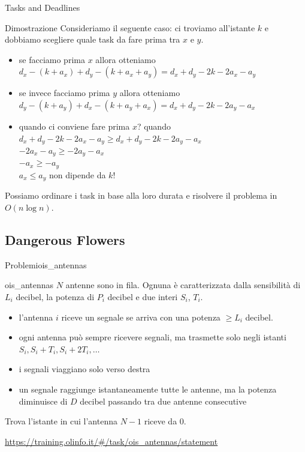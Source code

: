 \documentclass[compress]{beamer}
\begin{document}
\begin{frame}{Tasks and Deadlines}
    \begin{block}{Dimostrazione}
        Consideriamo il seguente caso: ci troviamo all'istante $k$ e dobbiamo scegliere quale task da fare prima tra $x$ e $y$.
        \begin{itemize}
            \pause
            \item se facciamo prima $x$ allora otteniamo $d_x-(k+a_x)+ d_y-(k+a_x+a_y) = d_x+d_y-2k-2a_x-a_y$
            \item se invece facciamo prima $y$ allora otteniamo $d_y-(k+a_y)+ d_x-(k+a_y+a_x) = d_x+d_y-2k-2a_y-a_x$
            \pause
            \item quando ci conviene fare prima $x$? quando \\ $d_x+d_y-2k-2a_x-a_y \geq d_x+d_y-2k-2a_y-a_x$ \\ \pause $-2a_x-a_y \geq -2a_y-a_x$  \pause \\ $-a_x \geq -a_y$ \\ $a_x \leq a_y$  non dipende da $k$!
        \end{itemize}
    \end{block}
    \pause
    Possiamo ordinare i task in base alla loro durata e risolvere il problema in $O(n \log n)$.
\end{frame}

\subsection{Dangerous Flowers}
\begin{frame}{Problemi}{ois\_antennas}
    \begin{exampleblock}{ois\_antennas}
        $N$ antenne sono in fila. Ognuna \`e caratterizzata dalla sensibilit\`a di $L_i$ decibel, la potenza di $P_i$ decibel e due interi $S_i$, $T_i$.
        \begin{itemize}
            \item l'antenna $i$ riceve un segnale se arriva con una potenza $\geq L_i$ decibel.
            \item ogni antenna pu\`o sempre ricevere segnali, ma trasmette solo negli istanti $S_i, S_i + T_i, S_i + 2T_i,  \dots$
            \item i segnali viaggiano solo verso destra
            \item un segnale raggiunge istantaneamente tutte le antenne, ma la potenza diminuisce di $D$ decibel passando tra due antenne consecutive
        \end{itemize}
        Trova l'istante in cui l'antenna $N-1$ riceve da $0$.
    \end{exampleblock}
    \underline{\url{https://training.olinfo.it/\#/task/ois_antennas/statement}}
\end{frame}
\end{document}
